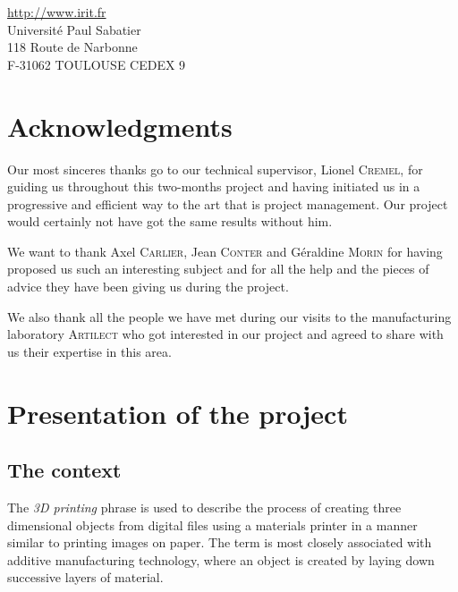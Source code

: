 \documentclass{report}
\begin{document}
\begin{center}
\url{http://www.irit.fr}\\
Université Paul Sabatier \\
118 Route de Narbonne \\
F-31062 TOULOUSE CEDEX 9
\end{center}

\thispagestyle{empty}

\newpage

\chapter*{Acknowledgments}

	Our most sinceres thanks go to our technical supervisor, Lionel \textsc{Cremel}, for guiding us throughout this two-months project and having initiated us in a progressive and efficient way to the art that is project management. Our project would certainly not have got the same results without him.\\

\bigskip

	We want to thank Axel \textsc{Carlier}, Jean \textsc{Conter} and Géraldine \textsc{Morin} for having proposed us such an interesting subject and for all the help and the pieces of advice they have been giving us during the project.\\

\bigskip

	We also thank all the people we have met during our visits to the manufacturing laboratory \textsc{Artilect} who got interested in our project and agreed to share with us their expertise in this area.

\tableofcontents

\chapter{Presentation of the project}

\section{The context}

	The \textit{3D printing} phrase is used to describe the process of creating three dimensional objects from digital files using a materials printer in a manner similar to printing images on paper. The term is most closely associated with additive manufacturing technology, where an object is created by laying down successive layers of material.\\
\end{document}
